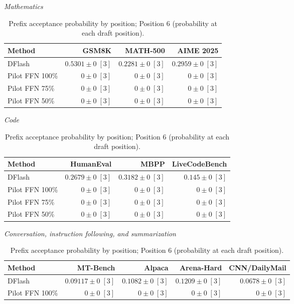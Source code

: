 \begin{table}[!htp]
\centering\small
\setlength{\tabcolsep}{3pt}
\caption{Prefix acceptance probability by position; Position 6 (probability at each draft position).}
\label{tab:appendix-metric-prefix-survival-6}
\textit{Mathematics}\par\smallskip
\begin{tabular}{@{}>{\raggedright\arraybackslash}p{3.7cm}rrr@{}}
\toprule
Method & GSM8K & MATH-500 & AIME 2025 \\
\midrule
DFlash & \(\mathbf{0.5301} \pm 0\;[3]\) & \(\mathbf{0.2281} \pm 0\;[3]\) & \(\mathbf{0.2959} \pm 0\;[3]\) \\
Pilot FFN 100\% & \(0 \pm 0\;[3]\) & \(0 \pm 0\;[3]\) & \(0 \pm 0\;[3]\) \\
Pilot FFN 75\% & \(0 \pm 0\;[3]\) & \(0 \pm 0\;[3]\) & \(0 \pm 0\;[3]\) \\
Pilot FFN 50\% & \(0 \pm 0\;[3]\) & \(0 \pm 0\;[3]\) & \(0 \pm 0\;[3]\) \\
\bottomrule
\end{tabular}\par\medskip
\textit{Code}\par\smallskip
\begin{tabular}{@{}>{\raggedright\arraybackslash}p{3.7cm}rrr@{}}
\toprule
Method & HumanEval & MBPP & LiveCodeBench \\
\midrule
DFlash & \(\mathbf{0.2679} \pm 0\;[3]\) & \(\mathbf{0.3182} \pm 0\;[3]\) & \(\mathbf{0.145} \pm 0\;[3]\) \\
Pilot FFN 100\% & \(0 \pm 0\;[3]\) & \(0 \pm 0\;[3]\) & \(0 \pm 0\;[3]\) \\
Pilot FFN 75\% & \(0 \pm 0\;[3]\) & \(0 \pm 0\;[3]\) & \(0 \pm 0\;[3]\) \\
Pilot FFN 50\% & \(0 \pm 0\;[3]\) & \(0 \pm 0\;[3]\) & \(0 \pm 0\;[3]\) \\
\bottomrule
\end{tabular}\par\medskip
\textit{Conversation, instruction following, and summarization}\par\smallskip
\begin{tabular}{@{}>{\raggedright\arraybackslash}p{3.7cm}rrrr@{}}
\toprule
Method & MT-Bench & Alpaca & Arena-Hard & CNN/DailyMail \\
\midrule
DFlash & \(\mathbf{0.09117} \pm 0\;[3]\) & \(\mathbf{0.1082} \pm 0\;[3]\) & \(\mathbf{0.1209} \pm 0\;[3]\) & \(\mathbf{0.0678} \pm 0\;[3]\) \\
Pilot FFN 100\% & \(0 \pm 0\;[3]\) & \(0 \pm 0\;[3]\) & \(0 \pm 0\;[3]\) & \(0 \pm 0\;[3]\) \\

\end{tabular}
\end{table}
